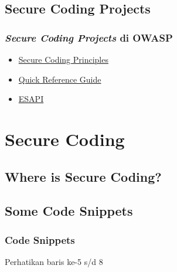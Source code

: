 \documentclass[xcolor=pdftex,table,handouts]{beamer}
\begin{document}
\subsection{Secure Coding Projects}

\begin{frame}
	\frametitle{\textit{Secure Coding Projects} di OWASP}
	\begin{itemize}
		\item {\href{https://www.owasp.org/index.php/Secure_Coding_Principles}{Secure Coding Principles}}
		\item {\href{https://www.owasp.org/index.php/OWASP_Secure_Coding_Practices_-_Quick_Reference_Guide}{Quick Reference Guide}}
		\item {\href{https://www.owasp.org/index.php/Category:OWASP_Enterprise_Security_API}{ESAPI}}
	\end{itemize}
\end{frame}

\section{Secure Coding}
\subsection{Where is Secure Coding?}


\subsection{Some Code Snippets}

\begin{frame}[fragile]
	\frametitle{Code Snippets}
			
	\begin{center}
	Perhatikan baris ke-5 s/d 8
	\end{center}
\end{frame}
\end{document}
